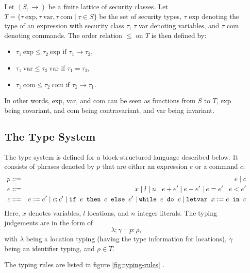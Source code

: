 \documentclass{llncs}
\newcommand{\lit}[1]{\mathrm{#1}}
\begin{document}
Let $(S, \rightarrow)$ be a finite lattice of security classes. Let $T = \{\tau\ \lit{exp}, \tau\ \lit{var}, \tau\ \lit{com} \mid \tau \in S\}$ be the set of security types, $\tau$ exp denoting the type of an expression with security class $\tau$, $\tau$ var denoting variables, and $\tau$ com denoting commands. The order relation $\leq$ on $T$ is then defined by:
\begin{itemize}
    \item $\tau_1\ \lit{exp} \leq \tau_2\ \lit{exp}$ if $\tau_1 \rightarrow \tau_2$,
    \item $\tau_1\ \lit{var} \leq \tau_2\ \lit{var}$ if $\tau_1 = \tau_2$,
    \item $\tau_1\ \lit{com} \leq \tau_2\ \lit{com}$ if $\tau_2 \rightarrow \tau_1$.
\end{itemize}
In other words, exp, var, and com can be seen as functions from $S$ to $T$, exp being covariant, and com being contravariant, and var being invariant. 


\subsection{The Type System}

The type system is defined for a block-structured language described below. It consists of phrases denoted by $p$ that are either an expression $e$ or a command $c$:
\begin{eqnarray}
p &::=& e \mid c \nonumber \\
e &::=& x \mid l \mid n \mid e + e' \mid e - e' \mid e = e' \mid e < e' \nonumber \\
c &::=& e := e' \mid c; c' \mid \mbox{\texttt{if }} e \mbox{\texttt{ then }} c \mbox{\texttt{ else }} c' \mid \mbox{\texttt{while }} e \mbox{\texttt{ do }} c \mid \mbox{\texttt{letvar }} x := e \mbox{\texttt{ in }} c \nonumber
\end{eqnarray}
Here, $x$ denotes variables, $l$ locations, and $n$ integer literals.
The typing judgements are in the form of
\[
\lambda; \gamma \vdash p : \rho,
\]
with $\lambda$ being a location typing (having the type information for locations), $\gamma$ being an identifier typing, and $\rho \in T$.

The typing rules are listed in figure \ref{fig:typing-rules} \cite{VolpanoIS96}.
\end{document}
